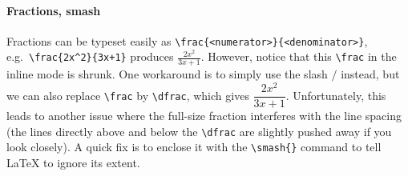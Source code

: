 \paragraph{Fractions, smash}
Fractions can be typeset easily as \texttt{\textbackslash frac\{<numerator>\}\allowbreak\{<denominator>\}}, e.g.\ \texttt{\textbackslash frac\{2x\^{}2\}\{3x+1\}} produces $\frac{2x^2}{3x+1}$. However, notice that this \texttt{\textbackslash frac} in the inline mode is shrunk. One workaround is to simply use the slash $/$ instead, but we can also replace \texttt{\textbackslash frac} by \texttt{\textbackslash dfrac}, which gives $\dfrac{2x^2}{3x+1}$. Unfortunately, this leads to another issue where the full-size fraction interferes with the line spacing (the lines directly above and below the \texttt{\textbackslash dfrac} are slightly pushed away if you look closely). A quick fix is to enclose it with the \texttt{\textbackslash smash\{\}} command to tell \LaTeX{} to ignore its extent.

